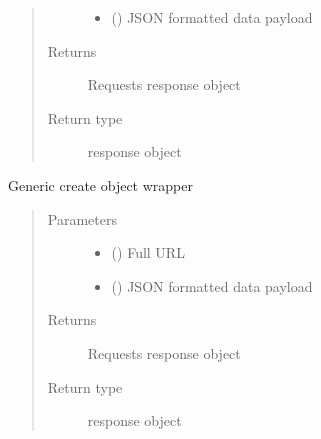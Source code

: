 \documentclass[letterpaper,10pt,english]{sphinxmanual}
\begin{document}
\begin{fulllineitems}
\begin{fulllineitems}
\begin{quote}
\begin{description}
\begin{itemize}
\item {} 
\sphinxAtStartPar
{} () \textendash{} JSON formatted data payload

\end{itemize}

\item[{Returns}] \leavevmode
\sphinxAtStartPar
Requests response object

\item[{Return type}] \leavevmode
\sphinxAtStartPar
response object

\end{description}\end{quote}

\end{fulllineitems}


\begin{fulllineitems}
\label{\detokenize{code:bloxone.bloxone.b1.update}}
\sphinxAtStartPar
Generic create object wrapper
\begin{quote}\begin{description}
\item[{Parameters}] \leavevmode\begin{itemize}
\item {} 
\sphinxAtStartPar
{} () \textendash{} Full URL

\item {} 
\sphinxAtStartPar
{} () \textendash{} JSON formatted data payload

\end{itemize}

\item[{Returns}] \leavevmode
\sphinxAtStartPar
Requests response object

\item[{Return type}] \leavevmode
\sphinxAtStartPar
response object

\end{description}\end{quote}

\end{fulllineitems}


\end{fulllineitems}
\end{document}
